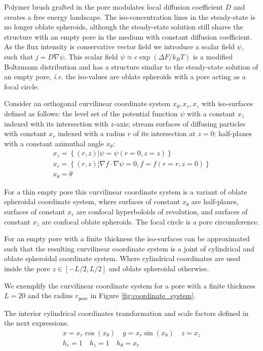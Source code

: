 \documentclass[10pt, a4paper]{article}
\begin{document}
\begin{multicols}{2}
Polymer brush grafted in the pore modulates local diffusion coefficient $D$ and creates a free energy landscape. 
The iso-concentration lines in the steady-state is no longer oblate spheroids, although the steady-state solution still shares the structure with an empty pore in the medium with constant diffusion coefficient.
As the flux intensity is conservative vector field we introduce a scalar field $\psi$, such that $j = D \nabla \psi$. 
This scalar field $\psi \approx c \exp(\Delta F/k_B T)$ is a modified Boltzmann distribution and  has a structure similar to the steady-state solution of an empty pore, \emph{i.e.} the iso-values are oblate spheroids with a pore acting as a focal circle.

Consider an orthogonal curvilinear coordinate system $x_{\theta}, x_{r}, x_{z}$ with iso-surfaces defined as follows:
the level set of the potential function $\psi$ with a constant $x_{z}$ indexed with its intersection with $z$-axis;
stream surfaces of diffusing particles with constant $x_{r}$ indexed with a radius $r$ of its intersection at $z=0$;
half-planes with a constant azimuthal angle $x_{\theta}$:
\begin{gather}
    x_z = \left\{(r, z) | \psi = \psi(r=0, z=z)\right\}
    \\
    x_r = \left\{(r, z) | \nabla f \cdot \nabla \psi = 0, f = f(r=r, z=0) \right\}
    \\
    x_{\theta} = \theta
\end{gather}

For a thin empty pore this curvilinear coordinate system is a variant of oblate spheroidal coordinate system, where surfaces of constant $x_{\theta}$ are half-planes, surfaces of constant $x_{r}$ are confocal hyperboloids of revolution, and surfaces of constant $x_{z}$ are confocal oblate spheroids. The focal circle is a pore circumference.

For an empty pore with a finite thickness the iso-surfaces can be approximated such that the resulting curvilinear coordinate system is a joint of cylindrical and oblate spheroidal coordinate system.
Where cylindrical coordinates are used inside the pore $z \in [-L/2, L/2]$ and oblate spheroidal otherwise.

We exemplify the curvilinear coordinate system for a pore with a finite thickness $L=20$ and the radius $r_{\textrm{pore}}$ in Figure \ref{fig:coordinate_system}.

The interior cylindrical coordinates transformation and scale factors defined in the next expressions.
\begin{gather}
    \label{eq:cyl_transformation_1}
    x = x_r \cos(x_{\theta}) \quad
    y = x_r \sin(x_{\theta}) \quad
    z = x_z
    \\
    \label{eq:cyl_transformation_2}
    h_r = 1 \quad
    h_z = 1 \quad
    h_{\theta} = x_r
\end{gather}


\end{multicols}
\end{document}

